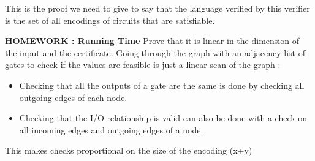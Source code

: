 This is the proof we need to give to say that the language verified by this verifier is the set of all encodings of circuits that are satisfiable. 

\textbf{HOMEWORK : Running Time} Prove that it is linear in the dimension of the input and the certificate. Going through the graph with an adjacency list of gates to check if the values are feasible is just a linear scan of the graph : 
\begin{itemize}
    \item Checking that all the outputs of a gate are the same is done by checking all outgoing edges of each node. 
    \item Checking that the I/O relationship is valid can also be done with a check on all incoming edges and outgoing edges of a node.
\end{itemize}
This makes checks proportional on the size of the encoding (x+y)
